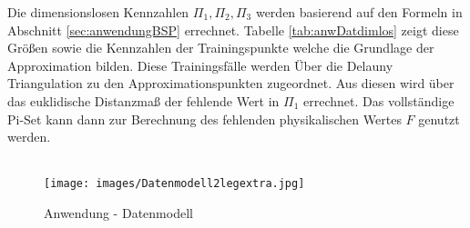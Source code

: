 Die dimensionslosen Kennzahlen $\Pi_1, \Pi_2, \Pi_3$ werden basierend auf den Formeln in Abschnitt \ref{sec:anwendungBSP} errechnet. Tabelle \ref{tab:anwDatdimlos} zeigt diese Größen sowie die Kennzahlen der Trainingspunkte welche die Grundlage der Approximation bilden. Diese Trainingsfälle werden Über die Delauny Triangulation zu den Approximationspunkten zugeordnet. Aus diesen wird über das euklidische Distanzmaß der fehlende Wert in $\Pi_1$ errechnet. Das vollständige Pi-Set kann dann zur Berechnung des fehlenden physikalischen Wertes $F$ genutzt werden.\\
\parskip 12pt \\
\begin{figure}[h]
	\centering
		\texttt{[image: images/Datenmodell2legextra.jpg]}
	\caption[Anwendung - Datenmodell]{Anwendung - Datenmodell}
	\label{fig:anwDatmod}
\end{figure}


